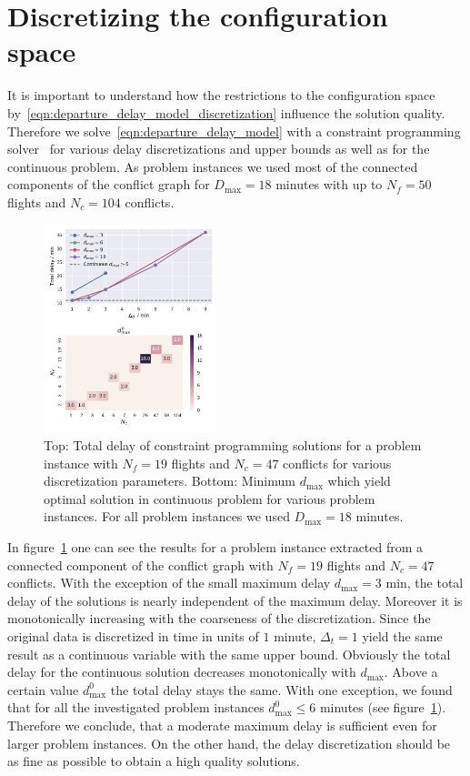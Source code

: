 \section{Discretizing the configuration space}
It is important to understand how the restrictions to the configuration space by~\eqref{eqn:departure_delay_model_discretization} influence the solution quality.
Therefore we solve~\eqref{eqn:departure_delay_model} with a constraint programming solver~\cite{numberjack} for various delay discretizations and upper bounds as well as for the continuous problem.
As problem instances we used most of the connected components of the conflict graph for $D_\text{max}=18$ minutes with up to $N_f=50$ flights and $N_c=104$ conflicts.
\begin{figure}[htpb]
    \centering
    \includegraphics[width=0.45\textwidth]{./pics/delay_only_cp_results.pdf}
    \caption{Top: Total delay of constraint programming solutions for a problem instance with $N_f=19$ flights and $N_c=47$ conflicts for various discretization parameters.
    Bottom: Minimum $d_\text{max}$ which yield optimal solution in continuous problem for various problem instances. For all problem instances we used $D_\text{max}=18$ minutes.}
\label{fig:delay_only_cp_results}
\end{figure}

In figure~\ref{fig:delay_only_cp_results} one can see the results for a problem instance extracted from a connected component of the conflict graph with $N_f=19$ flights and $N_c=47$ conflicts.
With the exception of the small maximum delay $d_\text{max} = 3$ min, the total delay of the solutions is nearly independent of the maximum delay.
Moreover it is monotonically increasing with the coarseness of the discretization.
Since the original data is discretized in time in units of $1$ minute, $\Delta_t=1$ yield the same result as a continuous variable with the same upper bound.
Obviously the total delay for the continuous solution decreases monotonically with $d_\text{max}$.
Above a certain value $d^0_\text{max}$ the total delay stays the same.
With one exception, we found that for all the investigated problem instances $d^0_\text{max}\leq6$ minutes (see figure~\ref{fig:delay_only_cp_results}).
Therefore we conclude, that a moderate maximum delay is sufficient even for larger problem instances.
On the other hand, the delay discretization should be as fine as possible to obtain a high quality solutions.

